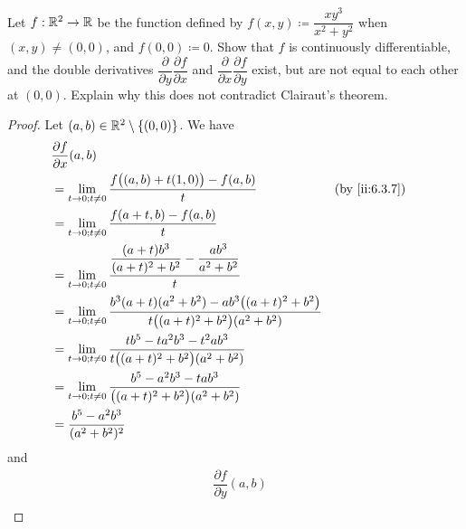 \exercisesection

\begin{ex}\label{ii:ex:6.5.1}
  Let \(f : \mathbb{R}^2 \to \mathbb{R}\) be the function defined by \(f(x, y) \coloneqq \dfrac{x y^3}{x^2 + y^2}\) when \((x, y) \neq (0, 0)\), and \(f(0, 0) \coloneqq 0\).
  Show that \(f\) is continuously differentiable, and the double derivatives \(\dfrac{\partial}{\partial y} \dfrac{\partial f}{\partial x}\) and \(\dfrac{\partial}{\partial x} \dfrac{\partial f}{\partial y}\) exist, but are not equal to each other at \((0, 0)\).
  Explain why this does not contradict Clairaut's theorem.
\end{ex}

\begin{proof}
  Let \((a, b) \in \mathbb{R}^2 \setminus \left\lbrace(0, 0)\right\rbrace\).
  We have
  \begin{align*}
     & \dfrac{\partial f}{\partial x}(a, b)                                                                                                                      \\
     & = \lim_{t \to 0 ; t \neq 0} \dfrac{f\big((a, b) + t(1, 0)\big) - f(a, b)}{t}                                                           &  & \by{ii:6.3.7} \\
     & = \lim_{t \to 0 ; t \neq 0} \dfrac{f(a + t, b) - f(a, b)}{t}                                                                                              \\
     & = \lim_{t \to 0 ; t \neq 0} \dfrac{\dfrac{(a + t) b^3}{(a + t)^2 + b^2} - \dfrac{ab^3}{a^2 + b^2}}{t}                                                     \\
     & = \lim_{t \to 0 ; t \neq 0} \dfrac{b^3 (a + t) (a^2 + b^2) - a b^3 \big((a + t)^2 + b^2\big)}{t \big((a + t)^2 + b^2\big) (a^2 + b^2)}                    \\
     & = \lim_{t \to 0 ; t \neq 0} \dfrac{t b^5 - t a^2 b^3 - t^2 a b^3}{t \big((a + t)^2 + b^2\big) (a^2 + b^2)}                                                \\
     & = \lim_{t \to 0 ; t \neq 0} \dfrac{b^5 - a^2 b^3 - t a b^3}{\big((a + t)^2 + b^2\big) (a^2 + b^2)}                                                        \\
     & = \dfrac{b^5 - a^2 b^3}{(a^2 + b^2)^2}
  \end{align*}
  and
  \begin{align*}
     & \dfrac{\partial f}{\partial y}(a, b)                                                                                                                        \\

\end{align*}
\end{proof}
